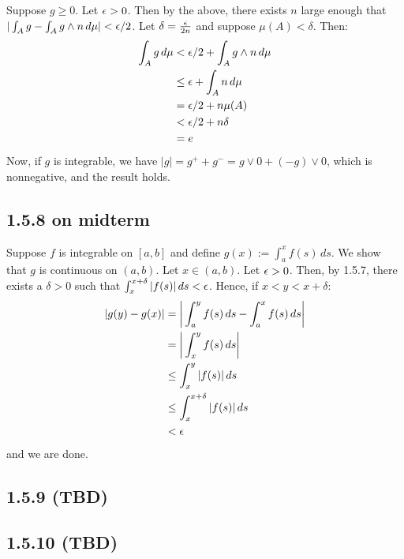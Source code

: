\documentclass[11pt]{article}
\begin{document}
Suppose $g \geq 0$. Let $\epsilon >0$. Then by the above, there exists $n$ large enough that $|\int_A g  -\int_A g \wedge n\,d\mu| < \epsilon/2$. Let $\delta = \frac{\epsilon}{2n}$ and suppose $\mu(A) < \delta$. Then: \begin{align*}
    \int_A g  \,d\mu &< \epsilon/2 + \int_A g \wedge n\,d\mu  \\
    &\leq \epsilon + \int_A n\,d\mu  \\
    &= \epsilon/2 + n\mu(A) \\
    &< \epsilon/2 + n \delta \\
    &= e
\end{align*}
Now, if $g$ is integrable, we have $|g| = g^+ + g^- = g\vee 0 + (-g)\vee 0$, which is nonnegative, and the result holds.

\subsection*{1.5.8 on midterm}

Suppose $f$ is integrable on $[a,b]$ and define $g(x) := \int_a^x f(s) \,ds$. We show that $g$ is continuous on $(a,b)$. Let $x \in (a,b)$. Let $\epsilon > 0$. Then, by 1.5.7, there exists a $\delta > 0$ such that $\int_{x}^{x + \delta} |f(s)|  \,ds < \epsilon$. Hence, if $x <y <x+\delta$: \begin{align*}
    |g(y) - g(x)| &= \bigg| \int_a^y f(s) \,ds - \int_a^x f(s) \,ds\bigg| \\
    &= \bigg| \int_x^y f(s) \,ds \bigg|\\
    &\leq  \int_x^y |f(s)| \,ds \\
    &\leq \int_x^{x+\delta} |f(s)| \,ds \\
    &< \epsilon
\end{align*} and we are done.

\subsection*{1.5.9 (TBD)}
\subsection*{1.5.10 (TBD)}
\end{document}
